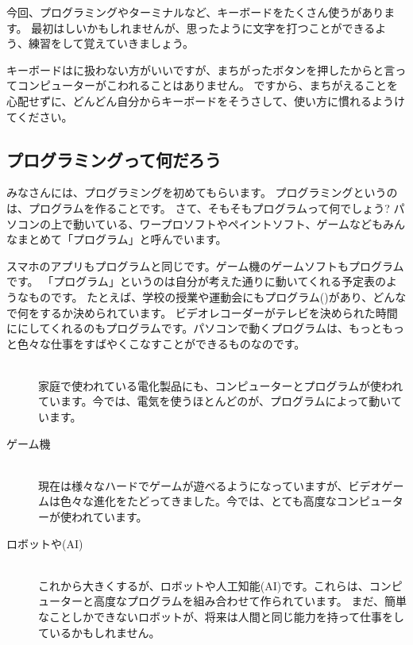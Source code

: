 \documentclass[text02.tex]{subfiles}
\begin{document}
今回、プログラミングやターミナルなど、キーボードをたくさん使うがあります。
最初はしいかもしれませんが、思ったように文字を打つことができるよう、練習をして覚えていきましょう。

キーボードはに扱わない方がいいですが、まちがったボタンを押したからと言ってコンピューターがこわれることはありません。
ですから、まちがえることを心配せずに、どんどん自分からキーボードをそうさして、使い方に慣れるようけてください。\clearpage


% 
% 
% 
\subsection{プログラミングって何だろう}

みなさんには、プログラミングを初めてもらいます。
プログラミングというのは、プログラムを作ることです。
さて、そもそもプログラムって何でしょう?
パソコンの上で動いている、ワープロソフトやペイントソフト、ゲームなどもみんなまとめて「プログラム」と呼んでいます。

スマホのアプリもプログラムと同じです。ゲーム機のゲームソフトもプログラムです。
「プログラム」というのは自分が考えた通りに動いてくれる予定表のようなものです。
たとえば、学校の授業や運動会にもプログラム()があり、どんなで何をするか決められています。
ビデオレコーダーがテレビを決められた時間ににしてくれるのもプログラムです。パソコンで動くプログラムは、もっともっと色々な仕事をすばやくこなすことができるものなのです。

\begin{description}
  \item[]\mbox{}\\
  家庭で使われている電化製品にも、コンピューターとプログラムが使われています。今では、電気を使うほとんどのが、プログラムによって動いています。
  \item[ゲーム機]\mbox{}\\
  現在は様々なハードでゲームが遊べるようになっていますが、ビデオゲームは色々な進化をたどってきました。今では、とても高度なコンピューターが使われています。
  \item[ロボットや(AI)]\mbox{}\\
  これから大きくするが、ロボットや人工知能(AI)です。これらは、コンピューターと高度なプログラムを組み合わせて作られています。
  まだ、簡単なことしかできないロボットが、将来は人間と同じ能力を持って仕事をしているかもしれません。
\end{description}
\end{document}
